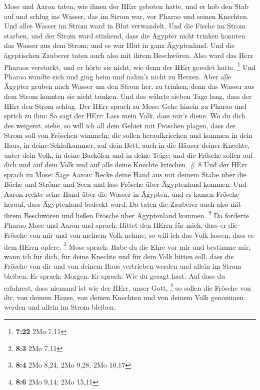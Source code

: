  Mose und Aaron taten, wie ihnen der HErr geboten hatte,
und er hob den Stab auf und schlug ins Wasser, das im Strom war, vor
Pharao und seinen Knechten. Und alles Wasser im Strom ward in Blut
verwandelt.  Und die Fische im Strom starben, und der Strom
ward stinkend, dass die Ägypter nicht trinken konnten das Wasser aus dem
Strom; und es war Blut in ganz Ägyptenland.  Und die
ägyptischen Zauberer taten auch also mit ihrem Beschwören. Also ward das
Herz Pharaos verstockt, und er hörte sie nicht, wie denn der HErr
geredet hatte. \footnote{\textbf{7:22} 2Mo 7,11}  Und
Pharao wandte sich und ging heim und nahm's nicht zu Herzen.
 Aber alle Ägypter gruben nach Wasser um den Strom her, zu
trinken; denn das Wasser aus dem Strom konnten sie nicht trinken.
 Und das währte sieben Tage lang, dass der HErr den Strom
schlug.  Der HErr sprach zu Mose: Gehe hinein zu Pharao und
sprich zu ihm: So sagt der HErr: Lass mein Volk, dass mir's diene.
 Wo du dich des weigerst, siehe, so will ich all dein
Gebiet mit Fröschen plagen,  dass der Strom soll von
Fröschen wimmeln; die sollen heraufkriechen und kommen in dein Haus, in
deine Schlafkammer, auf dein Bett, auch in die Häuser deiner Knechte,
unter dein Volk, in deine Backöfen und in deine Teige;  und
die Frösche sollen auf dich und auf dein Volk und auf alle deine Knechte
kriechen. \# 8  Und der HErr sprach zu Mose: Sage Aaron:
Recke deine Hand aus mit deinem Stabe über die Bäche und Ströme und Seen
und lass Frösche über Ägyptenland kommen.  Und Aaron reckte
seine Hand über die Wasser in Ägypten, und es kamen Frösche herauf, dass
Ägyptenland bedeckt ward.  Da taten die Zauberer auch also
mit ihrem Beschwören und ließen Frösche über Ägyptenland kommen.
\footnote{\textbf{8:3} 2Mo 7,11}  Da forderte Pharao Mose
und Aaron und sprach: Bittet den HErrn für mich, dass er die Frösche von
mir und von meinem Volk nehme, so will ich das Volk lassen, dass es dem
HErrn opfere. \footnote{\textbf{8:4} 2Mo 8,24; 2Mo 9,28; 2Mo 10,17}
 Mose sprach: Habe du die Ehre vor mir und bestimme mir,
wann ich für dich, für deine Knechte und für dein Volk bitten soll, dass
die Frösche von dir und von deinem Haus vertrieben werden und allein im
Strom bleiben.  Er sprach: Morgen. Er sprach: Wie du gesagt
hast. Auf dass du erfahrest, dass niemand ist wie der HErr, unser Gott,
\footnote{\textbf{8:6} 2Mo 9,14; 2Mo 15,11}  so sollen die
Frösche von dir, von deinem Hause, von deinen Knechten und von deinem
Volk genommen werden und allein im Strom bleiben.

